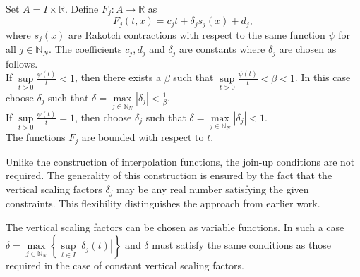 \documentclass[sn-mathphys-num]{sn-jnl}
\numberwithin{equation}{section}
\begin{document}
\noindent Set $A=I \times \mathbb{R}$. Define $F_j:A\rightarrow\mathbb{R}$ as
\begin{equation}
F_j(t,x)=c_jt+\delta_js_j(x)+d_j, \label{F_j}
\end{equation}
where $s_j(x)$ are Rakotch contractions with respect to the same function $\psi$ for all $j\in \mathbb N_N$. The coefficients $c_j, d_j$ and $\delta_j$ are constants where $\delta_j$ are chosen as follows.\\If $\sup\limits_{t>0}\frac{\psi(t)}{t}<1$, then there exists a $\beta$ such that $\sup\limits_{t>0}\frac{\psi(t)}{t}<\beta<1$. In this case choose $\delta_j$ such that $\delta=\max\limits_{j\in \mathbb{N}_N}|\delta_j|<\frac{1}{\beta}$. \\If $\sup\limits_{t>0}\frac{\psi(t)}{t}=1$, then choose $\delta_j$ such that $\delta=\max\limits_{j\in \mathbb{N}_N}|\delta_j|<1$.\\The functions $F_j$ are bounded with respect to $t$. 
\begin{remark}
    Unlike the construction of interpolation functions, the join-up conditions are not required. The generality of this construction is ensured by the fact that the vertical scaling factors $\delta_j$ may be any real number satisfying the given constraints. This flexibility distinguishes the approach from earlier work.
\end{remark}
\begin{remark}
The vertical scaling factors can be chosen as variable functions. In such a case $\delta=\max\limits_{j\in\mathbb{N}_N}\left\{\sup\limits_{t\in I}|\delta_j(t)|\right\}$ and $\delta$ must satisfy the same conditions as those required in the case of constant vertical scaling factors.
\end{remark}
\end{document}
